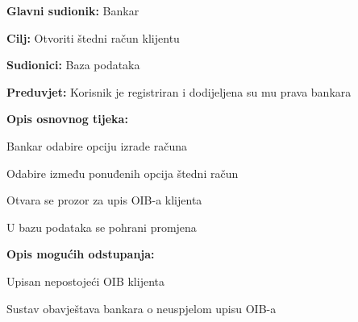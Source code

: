             
            \noindent {}
            \begin{packed_item}
            
              \item \textbf{Glavni sudionik: }Bankar
              \item  \textbf{Cilj:} Otvoriti štedni račun klijentu
              \item  \textbf{Sudionici:} Baza podataka
              \item  \textbf{Preduvjet:} Korisnik je registriran i dodijeljena su mu prava bankara
              \item  \textbf{Opis osnovnog tijeka:}
              
              \item[] \begin{packed_enum}
            
                \item Bankar odabire opciju izrade računa
                \item Odabire između  ponuđenih opcija štedni račun
                \item Otvara se prozor za upis OIB-a klijenta 
                \item U bazu podataka se pohrani promjena 
              \end{packed_enum}
              
              \item  \textbf{Opis mogućih odstupanja:}
              
              \item[] \begin{packed_item}
            
                \item[3.a] Upisan nepostojeći OIB klijenta 
                \item[] \begin{packed_enum}
                  
                  \item Sustav obavještava bankara o neuspjelom upisu OIB-a
                  
                \end{packed_enum}
                
              \end{packed_item}
            \end{packed_item}
            

